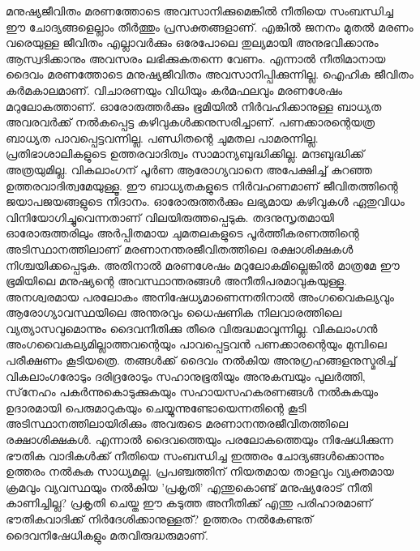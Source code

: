 മനുഷ്യജീവിതം മരണത്തോടെ അവസാനിക്കുമെങ്കില്‍ നീതിയെ സംബന്ധിച്ച ഈ ചോദ്യങ്ങളെല്ലാം തീര്‍ത്തും പ്രസക്തങ്ങളാണ്. എങ്കില്‍ ജനനം മുതല്‍ മരണം വരെയുള്ള ജീവിതം എല്ലാവര്‍ക്കും ഒരേപോലെ തുല്യമായി അനുഭവിക്കാനും ആസ്വദിക്കാനും അവസരം ലഭിക്കുകതന്നെ വേണം. എന്നാല്‍ നീതിമാനായ ദൈവം മരണത്തോടെ മനുഷ്യജീവിതം അവസാനിപ്പിക്കുന്നില്ല. ഐഹിക ജീവിതം കര്‍മകാലമാണ്. വിചാരണയും വിധിയും കര്‍മഫലവും മരണശേഷം മറുലോകത്താണ്. ഓരോരുത്തര്‍ക്കും ഭൂമിയില്‍ നിര്‍വഹിക്കാനുള്ള ബാധ്യത അവരവര്‍ക്ക് നല്‍കപ്പെട്ട കഴിവുകള്‍ക്കനുസരിച്ചാണ്. പണക്കാരന്റെയത്ര ബാധ്യത പാവപ്പെട്ടവന്നില്ല. പണ്ഡിതന്റെ ചുമതല പാമരന്നില്ല. പ്രതിഭാശാലികളുടെ ഉത്തരവാദിത്വം സാമാന്യബുദ്ധിക്കില്ല. മന്ദബുദ്ധിക്ക് അത്രയുമില്ല. വികലാംഗന് പൂര്‍ണ ആരോഗ്യവാനെ അപേക്ഷിച്ച് കുറഞ്ഞ ഉത്തരവാദിത്വമേയുള്ളൂ. ഈ ബാധ്യതകളുടെ നിര്‍വഹണമാണ് ജീവിതത്തിന്റെ ജയാപജയങ്ങളുടെ നിദാനം. ഓരോരുത്തര്‍ക്കും ലഭ്യമായ കഴിവുകള്‍ ഏതുവിധം വിനിയോഗിച്ചുവെന്നതാണ് വിലയിരുത്തപ്പെടുക. തദനുസൃതമായി ഓരോരുത്തരിലും അര്‍പ്പിതമായ ചുമതലകളുടെ പൂര്‍ത്തീകരണത്തിന്റെ അടിസ്ഥാനത്തിലാണ് മരണാനന്തരജീവിതത്തിലെ രക്ഷാശിക്ഷകള്‍ നിശ്ചയിക്കപ്പെടുക. അതിനാല്‍ മരണശേഷം മറുലോകമില്ലെങ്കില്‍ മാത്രമേ ഈ ഭൂമിയിലെ മനുഷ്യന്റെ അവസ്ഥാന്തരങ്ങള്‍ അനീതിപരമാവുകയുള്ളൂ. അനശ്വരമായ പരലോകം അനിഷേധ്യമാണെന്നതിനാല്‍ അംഗവൈകല്യവും ആരോഗ്യാവസ്ഥയിലെ അന്തരവും ധൈഷണിക നിലവാരത്തിലെ വ്യത്യാസവുമൊന്നും ദൈവനീതിക്കു തീരെ വിരുദ്ധമാവുന്നില്ല.
വികലാംഗന്‍ അംഗവൈകല്യമില്ലാത്തവന്റെയും പാവപ്പെട്ടവന്‍ പണക്കാരന്റെയും മുമ്പിലെ പരീക്ഷണം കൂടിയത്രെ. തങ്ങള്‍ക്ക് ദൈവം നല്‍കിയ അനുഗ്രഹങ്ങളനുസ്മരിച്ച് വികലാംഗരോടും ദരിദ്രരോടും സഹാനുഭൂതിയും അനുകമ്പയും പുലര്‍ത്തി, സ്‌നേഹം പകര്‍ന്നുകൊടുക്കുകയും സഹായസഹകരണങ്ങള്‍ നല്‍കുകയും ഉദാരമായി പെരുമാറുകയും ചെയ്യുന്നുണ്ടോയെന്നതിന്റെ കൂടി അടിസ്ഥാനത്തിലായിരിക്കും അവരുടെ മരണാനന്തരജീവിതത്തിലെ രക്ഷാശിക്ഷകള്‍.
എന്നാല്‍ ദൈവത്തെയും പരലോകത്തെയും നിഷേധിക്കുന്ന ഭൗതിക വാദികള്‍ക്ക് നീതിയെ സംബന്ധിച്ച ഇത്തരം ചോദ്യങ്ങള്‍ക്കൊന്നും ഉത്തരം നല്‍കുക സാധ്യമല്ല. പ്രപഞ്ചത്തിന് നിയതമായ താളവും വ്യക്തമായ ക്രമവും വ്യവസ്ഥയും നല്‍കിയ 'പ്രകൃതി' എന്തുകൊണ്ട് മനുഷ്യരോട് നീതി കാണിച്ചില്ല? പ്രകൃതി ചെയ്ത ഈ കടുത്ത അനീതിക്ക് എന്തു പരിഹാരമാണ് ഭൗതികവാദിക്ക് നിര്‍ദേശിക്കാനുള്ളത്? ഉത്തരം നല്‍കേണ്ടത് ദൈവനിഷേധികളും മതവിരുദ്ധരുമാണ്.


